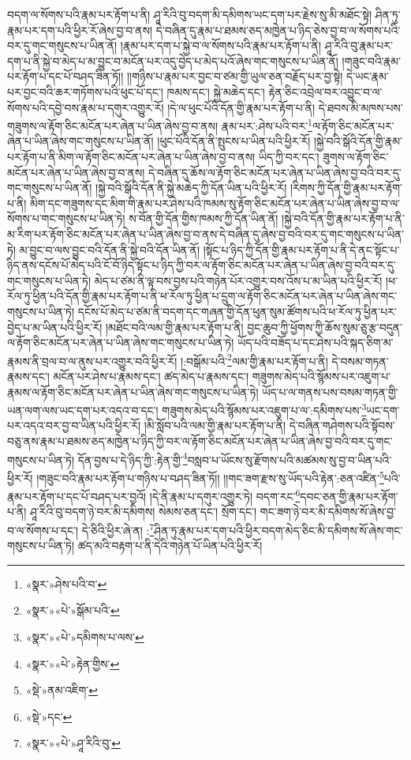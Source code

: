 བདག་ལ་སོགས་པའི་རྣམ་པར་རྟོག་པ་ནི། ཤཱ་རིའི་བུ་བདག་མི་དམིགས་ཡང་དག་པར་རྗེས་སུ་མི་མཐོང་སྟེ། ཤིན་ཏུ་རྣམ་པར་དག་པའི་ཕྱིར་རོ་ཞེས་བྱ་བ་ནས། དེ་བཞིན་དུ་རྣམ་པ་ཐམས་ཅད་མཁྱེན་པ་ཉིད་ཅེས་བྱ་བ་ལ་སོགས་པའི་བར་དུ་གང་གསུངས་པ་ཡིན་ནོ། །རྣམ་པར་དག་པ་སྐྱེ་བ་ལ་སོགས་པའི་རྣམ་པར་རྟོག་པ་ནི། ཤཱ་རིའི་བུ་རྣམ་པར་དག་པ་ནི་སྐྱེ་བ་མེད་པ་མ་བྱུང་བ་མངོན་པར་འདུ་བྱེད་པ་མེད་པའོ་ཞེས་གང་གསུངས་པ་ཡིན་ནོ། །གཟུང་བའི་རྣམ་པར་རྟོག་པ་དང་པོ་བཤད་ཟིན་ཏོ།། །།གཉིས་པ་རྣམ་པར་བྱང་བ་ཙམ་གྱི་ཡུལ་ཅན་བརྗོད་པར་བྱ་སྟེ། དེ་ཡང་རྣམ་པར་བྱང་བའི་ཆར་གཏོགས་པའི་ཕུང་པོ་དང་། ཁམས་དང་། སྐྱེ་མཆེད་དང་། རྟེན་ཅིང་འབྲེལ་བར་འབྱུང་བ་ལ་སོགས་པའི་དབྱེ་བས་རྣམ་པ་དགུར་འགྱུར་རོ། །དེ་ལ་ཕུང་པོའི་དོན་གྱི་རྣམ་པར་རྟོག་པ་ནི། དེ་ཐབས་མི་མཁས་པས་གཟུགས་ལ་རྟོག་ཅིང་མངོན་པར་ཞེན་པ་ཡིན་ཞེས་བྱ་བ་ནས། རྣམ་པར་:ཤེས་པའི་བར་\footnote{«སྣར་»ཤེས་པའི་བ་}ལ་རྟོག་ཅིང་མངོན་པར་ཞེན་པ་ཡིན་ཞེས་གང་གསུངས་པ་ཡིན་ནོ། །ཕུང་པོའི་དོན་ནི་སྤུངས་པ་ཡིན་པའི་ཕྱིར་རོ། །སྐྱེ་བའི་སྒོའི་དོན་གྱི་རྣམ་པར་རྟོག་པ་ནི་མིག་ལ་རྟོག་ཅིང་མངོན་པར་ཞེན་པ་ཡིན་ཞེས་བྱ་བ་ནས། ཡིད་ཀྱི་བར་དང་། ཟུགས་ལ་རྟོག་ཅིང་མངོན་པར་ཞེན་པ་ཡིན་ཞེས་བྱ་བ་ནས། དེ་བཞིན་དུ་ཆོས་ལ་རྟོག་ཅིང་མངོན་པར་ཞེན་པ་ཡིན་ཞེས་བྱ་བའི་བར་དུ་གང་གསུངས་པ་ཡིན་ནོ། །སྐྱེ་བའི་སྒོའི་དོན་ནི་སྐྱེ་མཆེད་ཀྱི་དོན་ཡིན་པའི་ཕྱིར་རོ། །རིགས་ཀྱི་དོན་གྱི་རྣམ་པར་རྟོག་པ་ནི། མིག་དང་གཟུགས་དང་མིག་གི་རྣམ་པར་ཤེས་པའི་ཁམས་སུ་རྟོག་ཅིང་མངོན་པར་ཞེན་པ་ཡིན་ཞེས་བྱ་བ་ལ་སོགས་པ་གང་གསུངས་པ་ཡིན་ཏེ། ས་བོན་གྱི་དོན་གྱིས་ཁམས་ཀྱི་དོན་ཡིན་ནོ། །སྐྱེ་བའི་དོན་གྱི་རྣམ་པར་རྟོག་པ་ནི་མ་རིག་པར་རྟོག་ཅིང་མངོན་པར་ཞེན་པ་ཡིན་ཞེས་བྱ་བ་ནས་དེ་བཞིན་དུ་ཞེས་བྱ་བའི་བར་དུ་གང་གསུངས་པ་ཡིན་ཏེ། མ་བྱུང་བ་ལས་བྱུང་བའི་དོན་ནི་སྐྱེ་བའི་དོན་ཡིན་ནོ། །སྟོང་པ་ཉིད་ཀྱི་དོན་གྱི་རྣམ་པར་རྟོག་པ་ནི་དེ་ནང་སྟོང་པ་ཉིད་ནས་དངོས་པོ་མེད་པའི་ངོ་བོ་ཉིད་སྟོང་པ་ཉིད་ཀྱི་བར་ལ་རྟོག་ཅིང་མངོན་པར་ཞེན་པ་ཡིན་ཞེས་བྱ་བའི་བར་དུ་གང་གསུངས་པ་ཡིན་ཏེ། མེད་པ་ཙམ་ནི་ལྟ་བས་བྱས་པའི་གཉེན་པོར་འགྱུར་བས་འོས་པ་མ་ཡིན་པའི་ཕྱིར་རོ། །ཕ་རོལ་ཏུ་ཕྱིན་པའི་དོན་གྱི་རྣམ་པར་རྟོག་པ་ནི་ཕ་རོལ་ཏུ་ཕྱིན་པ་དྲུག་ལ་རྟོག་ཅིང་མངོན་པར་ཞེན་པ་ཡིན་ཞེས་གང་གསུངས་པ་ཡིན་ཏེ། དངོས་པོ་མེད་པ་ཙམ་ནི་བདག་དང་གཞན་གྱི་དོན་ཕུན་སུམ་ཚོགས་པའི་ཕ་རོལ་ཏུ་ཕྱིན་པར་བྱེད་པ་མ་ཡིན་པའི་ཕྱིར་རོ། །མཐོང་བའི་ལམ་གྱི་རྣམ་པར་རྟོག་པ་ནི། བྱང་ཆུབ་ཀྱི་ཕྱོགས་ཀྱི་ཆོས་སུམ་ཅུ་རྩ་བདུན་ལ་རྟོག་ཅིང་མངོན་པར་ཞེན་པ་ཡིན་ཞེས་གང་གསུངས་པ་ཡིན་ཏེ། ཡོད་པའི་བཟོད་པ་དང་ཤེས་པའི་སྐད་ཅིག་མ་རྣམས་ནི་བྲལ་བ་ལ་ནུས་པར་འགྱུར་བའི་ཕྱིར་རོ། །:བསྒོམ་པའི་\footnote{«སྣར་»«པེ་»སྒོམ་པའི་}ལམ་གྱི་རྣམ་པར་རྟོག་པ་ནི། དེ་བསམ་གཏན་རྣམས་དང་། མངོན་པར་ཤེས་པ་རྣམས་དང་། ཚད་མེད་པ་རྣམས་དང་། གཟུགས་མེད་པའི་སྙོམས་པར་འཇུག་པ་རྣམས་ལ་རྟོག་ཅིང་མངོན་པར་ཞེན་པ་ཡིན་ཞེས་གང་གསུངས་པ་ཡིན་ཏེ། ཡོད་པ་ལ་གནས་པས་བསམ་གཏན་གྱི་ཡན་ལག་ལས་ཡང་དག་པར་འདའ་བ་དང་། གཟུགས་མེད་པའི་སྙོམས་པར་འཇུག་པ་ལ་:དམིགས་པས་\footnote{«སྣར་»«པེ་»དམིགས་པ་ལས་}ཡང་དག་པར་འདའ་བར་བྱ་བ་ཡིན་པའི་ཕྱིར་རོ། །མི་སློབ་པའི་ལམ་གྱི་རྣམ་པར་རྟོག་པ་ནི། དེ་བཞིན་གཤེགས་པའི་སྟོབས་བཅུ་ནས་རྣམ་པ་ཐམས་ཅད་མཁྱེན་པ་ཉིད་ཀྱི་བར་ལ་རྟོག་ཅིང་མངོན་པར་ཞེན་པ་ཡིན་ཞེས་བྱ་བའི་བར་དུ་གང་གསུངས་པ་ཡིན་ཏེ། དོན་བྱས་པ་དེ་ཉིད་ཀྱི་:རྟེན་གྱི་\footnote{«སྣར་»«པེ་»རྟེན་གྱིས་}བསླབ་པ་ཡོངས་སུ་རྫོགས་པའི་མཚམས་སུ་བྱ་བ་ཡིན་པའི་ཕྱིར་རོ། །གཟུང་བའི་རྣམ་པར་རྟོག་པ་གཉིས་པ་བཤད་ཟིན་ཏོ།། །།གང་ཟག་རྫས་སུ་ཡོད་པའི་རྟེན་:ཅན་འཛིན་\footnote{«སྡེ་»ནམ་འཇིག་}པའི་རྣམ་པར་རྟོག་པ་དང་པོ་བཤད་པར་བྱའོ། །དེ་ནི་རྣམ་པ་དགུར་འགྱུར་ཏེ། བདག་རང་\footnote{«སྡེ་»དང་}དབང་ཅན་གྱི་རྣམ་པར་རྟོག་པ་ནི། ཤཱ་རིའི་བུ་བདག་ཉེ་བར་མི་དམིགས། སེམས་ཅན་དང་། སྲོག་དང་། གང་ཟག་ཉེ་བར་མི་དམིགས་སོ་ཞེས་བྱ་བ་ལ་སོགས་པ་དང་། དེ་ཅིའི་ཕྱིར་ཞེ་ན། :\footnote{«སྣར་»«པེ་»ཤཱ་རིའི་བུ་}ཤིན་ཏུ་རྣམ་པར་དག་པའི་ཕྱིར་བདག་མེད་ཅིང་མི་དམིགས་སོ་ཞེས་གང་གསུངས་པ་ཡིན་ཏེ། ཚད་མའི་བརྟག་པ་ནི་དེའི་གཉེན་པོ་ཡིན་པའི་ཕྱིར་རོ། 
